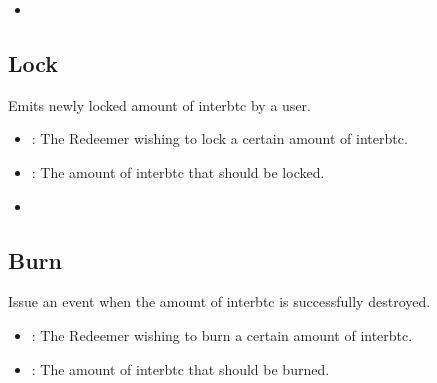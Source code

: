 \documentclass[a4paper,10pt,english]{sphinxmanual}
\begin{document}
\begin{itemize}
\item {} 
{\hyperref[\detokenize{spec/treasury:mint}]{}}

\end{itemize}


\subsection{Lock}
\label{\detokenize{spec/treasury:id14}}
Emits newly locked amount of interbtc by a user.



\begin{itemize}
\item {} 
: The Redeemer wishing to lock a certain amount of interbtc.

\item {} 
: The amount of interbtc that should be locked.

\end{itemize}

\begin{itemize}
\item {} 
{\hyperref[\detokenize{spec/treasury:lock}]{}}

\end{itemize}


\subsection{Burn}
\label{\detokenize{spec/treasury:id15}}
Issue an event when the amount of interbtc is successfully destroyed.



\begin{itemize}
\item {} 
: The Redeemer wishing to burn a certain amount of interbtc.

\item {} 
: The amount of interbtc that should be burned.

\end{itemize}
\end{document}

